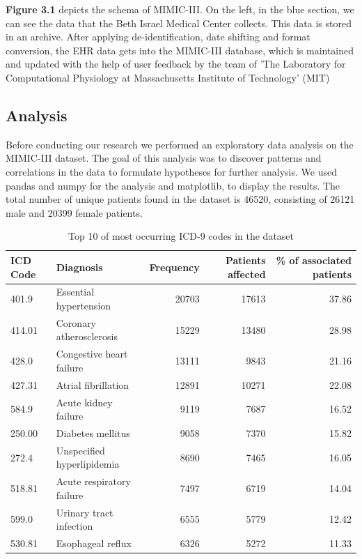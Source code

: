 \documentclass[11pt, a4paper]{book}
\begin{document}
\textbf{Figure 3.1} depicts the schema of MIMIC-III. On the left, in the blue section, we can see the data that the Beth Israel Medical Center collects. This data is stored in an archive. After applying de-identification, date shifting and format conversion, the EHR data gets into the MIMIC-III database, which is maintained and updated with the help of user feedback by the team of 'The Laboratory for Computational Physiology at Massachusetts Institute of Technology' (MIT) \cite{johnson2016mimic}
\subsection{Analysis}

Before conducting our research we performed an exploratory data analysis on the MIMIC-III dataset. The goal of this analysis was to discover patterns and correlations in the data to formulate hypotheses for further analysis. We used pandas and numpy for the analysis and matplotlib, to display the results. The total number of unique patients found in the dataset is 46520, consisting of 26121 male and 20399 female patients.


\begin{table}
\begin{tabularx}{\textwidth}{X|l|r|r|r}
ICD Code & Diagnosis & Frequency & Patients affected & \% of associated patients \\
\hline
401.9 & Essential hypertension & 20703 & 17613 & 37.86\\
414.01 &  Coronary atherosclerosis & 15229 & 13480 & 28.98 \\
428.0 & Congestive heart failure &   13111 & 9843 &21.16\\
427.31 & Atrial fibrillation&    12891 & 10271 &  22.08\\
584.9 &  Acute kidney failure &  9119 & 7687& 16.52\\
250.00 & Diabetes mellitus &  9058 & 7370 & 15.82\\
272.4 & Unspecified hyperlipidemia & 8690 & 7465 & 16.05 \\
518.81 &  Acute respiratory failure & 7497 & 6719 & 14.04 \\
599.0 &   Urinary tract infection &  6555 & 5779 & 12.42 \\
530.81 & Esophageal reflux &  6326 & 5272 & 11.33\\
\end{tabularx}
\caption{\label{tab:top10-codes-dataset}Top 10 of most occurring ICD-9 codes in the dataset}
\end{table}
\end{document}
